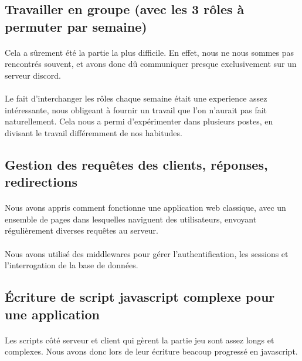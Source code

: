 \documentclass[11pt,a4paper]{article}
\begin{document}
        \subsection*{Travailler en groupe (avec les 3 rôles à permuter par semaine)}
            \paragraph{}
            Cela a sûrement été la partie la plus difficile.
            En effet, nous ne nous sommes pas rencontrés souvent,
            et avons donc dû communiquer presque exclusivement sur un serveur discord.
            \paragraph{}
            Le fait d'interchanger les rôles chaque semaine était une experience assez intéressante,
            nous obligeant à fournir un travail que l'on n'aurait pas fait naturellement.
            Cela nous a permi d'expérimenter dans plusieurs postes,
            en divisant le travail différemment de nos habitudes.
        \subsection*{Gestion des requêtes des clients, réponses, redirections}
            \paragraph{}
            Nous avons appris comment fonctionne une application web classique,
            avec un ensemble de pages dans lesquelles naviguent des utilisateurs,
            envoyant régulièrement diverses requêtes au serveur.
            \paragraph{}
            Nous avons utilisé des middlewares pour gérer l'authentification,
            les sessions et l'interrogation de la base de données.
        \subsection*{Écriture de script javascript complexe pour une application}
            \paragraph{}
            Les scripts côté serveur et client qui gèrent la partie jeu sont assez longs et complexes.
            Nous avons donc lors de leur écriture beacoup progressé en javascript.
\end{document}
